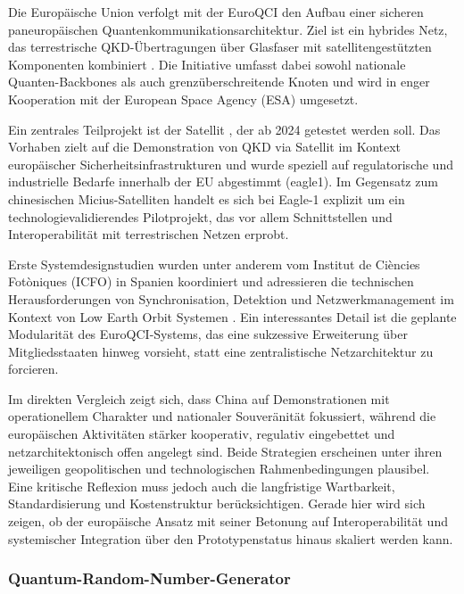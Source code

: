 Die Europäische Union verfolgt mit der EuroQCI den Aufbau einer sicheren paneuropäischen Quantenkommunikationsarchitektur. Ziel ist ein hybrides Netz, das terrestrische QKD-Übertragungen über Glasfaser mit satellitengestützten Komponenten kombiniert \cite{noauthor_european_2020}. Die Initiative umfasst dabei sowohl nationale Quanten-Backbones als auch grenzüberschreitende Knoten und wird in enger Kooperation mit der European Space Agency (ESA) umgesetzt.

Ein zentrales Teilprojekt ist der Satellit \cite{noauthor_eagle-1_2025}, der ab 2024 getestet werden soll. Das Vorhaben zielt auf die Demonstration von QKD via Satellit im Kontext europäischer Sicherheitsinfrastrukturen und wurde speziell auf regulatorische und industrielle Bedarfe innerhalb der EU abgestimmt (eagle1). Im Gegensatz zum chinesischen Micius-Satelliten handelt es sich bei Eagle-1 explizit um ein technologievalidierendes Pilotprojekt, das vor allem Schnittstellen und Interoperabilität mit terrestrischen Netzen erprobt.

Erste Systemdesignstudien wurden unter anderem vom Institut de Ciències Fotòniques (ICFO) in Spanien koordiniert und adressieren die technischen Herausforderungen von Synchronisation, Detektion und Netzwerkmanagement im Kontext von Low Earth Orbit Systemen \cite{van_deventer_towards_2022}. Ein interessantes Detail ist die geplante Modularität des EuroQCI-Systems, das eine sukzessive Erweiterung über Mitgliedsstaaten hinweg vorsieht, statt eine zentralistische Netzarchitektur zu forcieren.

Im direkten Vergleich zeigt sich, dass China auf Demonstrationen mit operationellem Charakter und nationaler Souveränität fokussiert, während die europäischen Aktivitäten stärker kooperativ, regulativ eingebettet und netzarchitektonisch offen angelegt sind. Beide Strategien erscheinen unter ihren jeweiligen geopolitischen und technologischen Rahmenbedingungen plausibel. Eine kritische Reflexion muss jedoch auch die langfristige Wartbarkeit, Standardisierung und Kostenstruktur berücksichtigen. Gerade hier wird sich zeigen, ob der europäische Ansatz mit seiner Betonung auf Interoperabilität und systemischer Integration über den Prototypenstatus hinaus skaliert werden kann.

\subsubsection{Quantum-Random-Number-Generator}

